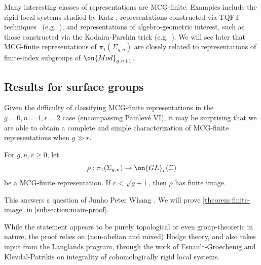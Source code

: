 Many interesting classes of
representations are MCG-finite.
Examples include
the rigid local systems studied by Katz \cite{katz2016rigid},
representations constructed via TQFT techniques ~(e.g.~\cite{kuperberg2011denseness,koberda2016quotients,koberda2018irreducibility,koberda2018representation}),
and representations of algebro-geometric interest, such as those constructed via the Kodaira-Parshin trick (e.g.~\cite[Example 3.3.1]{lawrence2019representations}).
We will see later that MCG-finite representations of $\pi_1(\Sigma_{g,n})$ are closely related to representations of finite-index subgroups of $\on{Mod}_{g,n+1}$.



\subsection{Results for surface groups}
\label{subsection:surface-groups}
Given the difficulty of classifying MCG-finite representations in the $g = 0, n = 4, r = 2$ case (encompassing Painlev\'e VI), it may be surprising that
 we are able to obtain a complete and simple characterization of MCG-finite representations when
$g \gg r$.

\begin{theorem}
\notready\label{theorem:finite-image}
	For $g, n, r\geq 0$, let
	$$\rho: \pi_1(\Sigma_{g,n})\to \on{GL}_r(\mathbb{C})$$ be a MCG-finite
representation. If $r<\sqrt{g+1}$, then $\rho$ has finite image.
\end{theorem}
	This answers a question of Junho Peter Whang \cite[Question
	1.5.3]{lawrence2019representations}. We will prove
	\autoref{theorem:finite-image} in
\autoref{subsection:main-proof}.

	While the statement appears to be purely topological or even group-theoretic in nature, the proof relies on (non-abelian and mixed) Hodge theory, and also takes input from the Langlands program, through the work of Esnault-Groechenig \cite{esnault2018cohomologically}
and Klevdal-Patrikis \cite{klevdalP:g-rigid-local-systems-are-integral}
on integrality of cohomologically rigid local systems.


